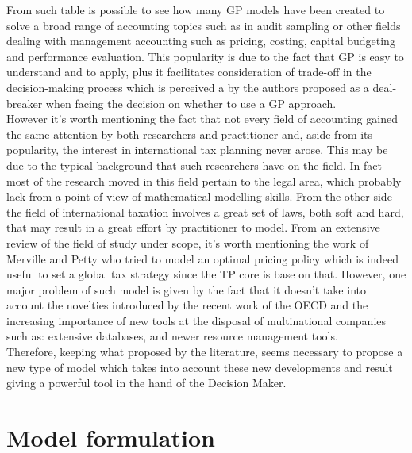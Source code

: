 \begin{doublespace}
From such table is possible to see how many GP models have been created to solve a broad range of accounting topics such as in audit sampling or other fields dealing with management accounting such as pricing, costing, capital budgeting and performance evaluation.
This popularity is due to the fact that GP is easy to understand and to apply, plus it facilitates consideration of trade-off in the decision-making process which is perceived a by the authors proposed as a deal-breaker when facing the decision on whether to use a GP approach.
\\
However it's worth mentioning the fact that not every field of accounting gained the same attention by both researchers and practitioner and, aside from its popularity, the interest in international tax planning never arose. This may be due to the typical background that such researchers have on the field. In fact most of the research moved in this field pertain to the legal area, which probably lack from a point of view of mathematical modelling skills. From the other side the field of international taxation involves a great set of laws, both soft and hard, that may result in a great effort by practitioner to model. 
From an extensive review of the field of study under scope, it's worth mentioning the work of Merville and Petty\cite{Merville1978} who tried to model an optimal pricing policy which is indeed useful to set a global tax strategy since the TP core is base on that. However, one major problem of such model is given by the fact that it doesn't take into account the novelties introduced by the recent work of the OECD and the increasing importance of new tools at the disposal of multinational companies such as: extensive databases, and newer resource management tools.
\\
Therefore, keeping what proposed by the literature, seems necessary to propose a new type of model which takes into account these new developments and result giving a powerful tool in the hand of the Decision Maker.

\pagebreak

\section{Model formulation}


\end{doublespace}
